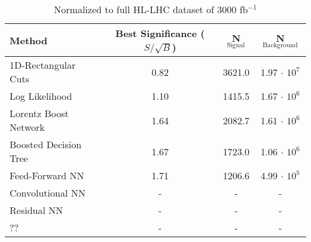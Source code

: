 \documentclass{article}
\begin{document}
\begin{table}[h!]
  \begin{center}
    \begin{tabular}{|l|c|c|c|} %
      \hline\hline
      \textbf{Method} & Best Significance ($S/\sqrt{B}$) & \textbf{N$_{\mathrm{Signal}}$} & \textbf{N$_{\mathrm{Background}}$}\\
      \hline
      1D-Rectangular Cuts & 0.82 & 3621.0 & 1.97  $\cdot$ $10^7$\\
      Log Likelihood & 1.10 & 1415.5 & 1.67 $\cdot$ $10^6$ \\
      Lorentz Boost Network & 1.64 & 2082.7 & 1.61 $\cdot$ $10^6$ \\
      Boosted Decision Tree & 1.67 & 1723.0 & 1.06 $\cdot$ $10^6$ \\
      Feed-Forward NN & 1.71 & 1206.6 & 4.99 $\cdot$ $10^5$ \\
      Convolutional NN & - & - & - \\

      Residual NN & - & - & - \\
      ?? & - & - & - \\
      \hline\hline
    \end{tabular}
    \caption{Normalized to full HL-LHC dataset of 3000 fb$^{-1}$}
  \end{center}
\end{table}
\end{document}

